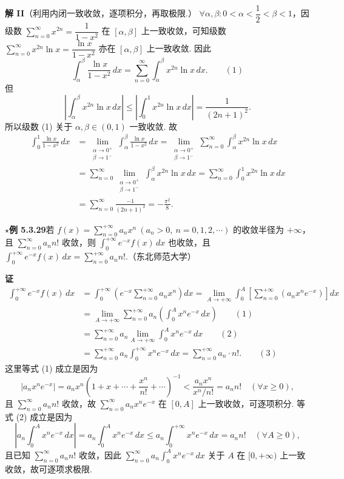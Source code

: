 \documentclass[UTF8,12pt,a4paper,fontset=fandol]{ctexart}
\begin{document}
\noindent\textbf{解 II}\quad （利用内闭一致收敛，逐项积分，再取极限.）
$\forall\alpha,\beta:0<\alpha<\dfrac12<\beta<1$，因级数
$\displaystyle\sum_{n=0}^{\infty}x^{2n}=\dfrac1{1-x^2}$ 在 $[\alpha,\beta]$ 上一致收敛，可知级数
$\displaystyle\sum_{n=0}^{\infty}x^{2n}\ln x=\dfrac{\ln x}{1-x^2}$ 亦在 $[\alpha,\beta]$ 上一致收敛. 因此
\[
  \int_\alpha^\beta\frac{\ln x}{1-x^2}\,dx
  =\sum_{n=0}^{\infty}\int_\alpha^\beta x^{2n}\ln x\,dx. \qquad(1)
\]
但
\[
  \left|\int_\alpha^\beta x^{2n}\ln x\,dx\right|
  \le\left|\int_0^1x^{2n}\ln x\,dx\right|
  =\frac1{(2n+1)^2}.
\]
所以级数 (1) 关于 $\alpha,\beta\in(0,1)$ 一致收敛. 故
\[
\begin{aligned}
\int_0^1\frac{\ln x}{1-x^2}\,dx
&=\lim_{\substack{\alpha\to0^+\\ \beta\to1^-}}\int_\alpha^\beta\frac{\ln x}{1-x^2}\,dx
=\lim_{\substack{\alpha\to0^+\\ \beta\to1^-}}\sum_{n=0}^{\infty}\int_\alpha^\beta x^{2n}\ln x\,dx\\
&=\sum_{n=0}^{\infty}\lim_{\substack{\alpha\to0^+\\ \beta\to1^-}}\int_\alpha^\beta x^{2n}\ln x\,dx
=\sum_{n=0}^{\infty}\int_0^1x^{2n}\ln x\,dx\\
&=\sum_{n=0}^{\infty}\frac{-1}{(2n+1)^2}
=-\frac{\pi^2}{8}.
\end{aligned}
\]

\noindent\(\star\)\textbf{例 5.3.29}\quad 若
$f(x)=\displaystyle\sum_{n=0}^{+\infty}a_nx^n\ (a_n>0,\ n=0,1,2,\cdots)$ 的收敛半径为 $+\infty$，且
$\displaystyle\sum_{n=0}^{\infty}a_nn!$ 收敛，则
$\displaystyle\int_0^{+\infty}e^{-x}f(x)\,dx$ 也收敛，且
$\displaystyle\int_0^{+\infty}e^{-x}f(x)\,dx=\sum_{n=0}^{+\infty}a_nn!$.（东北师范大学）

\noindent\textbf{证}\quad
\[
\begin{aligned}
\int_0^{+\infty}e^{-x}f(x)\,dx
&=\int_0^{+\infty}\left(e^{-x}\sum_{n=0}^{+\infty}a_nx^n\right)dx
=\lim_{A\to+\infty}\int_0^A\left[\sum_{n=0}^{+\infty}(a_nx^ne^{-x})\right]dx\\
&=\lim_{A\to+\infty}\sum_{n=0}^{+\infty}a_n\left(\int_0^A x^ne^{-x}\,dx\right)\qquad(1)\\
&=\sum_{n=0}^{+\infty}a_n\lim_{A\to+\infty}\int_0^A x^ne^{-x}\,dx\qquad(2)\\
&=\sum_{n=0}^{+\infty}a_n\int_0^{+\infty}x^ne^{-x}\,dx
=\sum_{n=0}^{+\infty}a_n\cdot n!.\qquad(3)
\end{aligned}
\]
这里等式 (1) 成立是因为
\[
  |a_nx^ne^{-x}|=a_nx^n\left(1+x+\cdots+\frac{x^n}{n!}+\cdots\right)^{-1}
  <\frac{a_nx^n}{x^n/n!}=a_nn!\quad(\forall x\ge0),
\]
且 $\displaystyle\sum_{n=0}^{\infty}a_nn!$ 收敛，故
$\displaystyle\sum_{n=0}^{\infty}a_nx^ne^{-x}$ 在 $[0,A]$ 上一致收敛，可逐项积分. 等式 (2) 成立是因为
\[
  \left|a_n\int_0^A x^ne^{-x}\,dx\right|
  =a_n\int_0^A x^ne^{-x}\,dx
  \le a_n\int_0^{+\infty}x^ne^{-x}\,dx=a_nn!\quad(\forall A\ge0),
\]
且已知 $\displaystyle\sum_{n=0}^{\infty}a_nn!$ 收敛，因此
$\displaystyle\sum_{n=0}^{\infty}a_n\int_0^A x^ne^{-x}\,dx$ 关于 $A$ 在 $[0,+\infty)$ 上一致收敛，故可逐项求极限.
\end{document}
